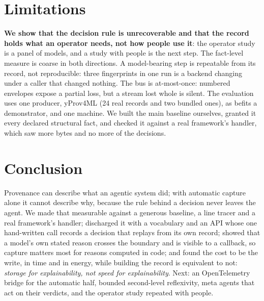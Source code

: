 \documentclass[conference]{IEEEtran}
\begin{document}
\section{Limitations}\label{sec:6}

\noindent \textbf{We show that the decision rule is unrecoverable and that the record holds what an operator needs, not how people use it}: the operator study is a panel of models, and a study with people is the next step. The fact-level measure is coarse in both directions. A model-bearing step is repeatable from its record, not reproducible: three fingerprints in one run is a backend changing under a caller that changed nothing. The bus is at-most-once: numbered envelopes expose a partial loss, but a stream lost whole is silent. The evaluation uses one producer, yProv4ML (24 real records and two bundled ones), as befits a demonstrator, and one machine. We built the main baseline ourselves, granted it every declared structural fact, and checked it against a real framework's handler, which saw more bytes and no more of the decisions.

\section{Conclusion}\label{sec:7}

\noindent Provenance can describe what an agentic system did; with automatic capture alone it cannot describe why, because the rule behind a decision never leaves the agent. We made that measurable against a generous baseline, a line tracer and a real framework's handler; discharged it with a vocabulary and an API whose one hand-written call records a decision that replays from its own record; showed that a model's own stated reason crosses the boundary and is visible to a callback, so capture matters most for reasons computed in code; and found the cost to be the write, in time and in energy, while building the record is equivalent to not: \emph{storage for explainability, not speed for explainability}. Next: an OpenTelemetry bridge for the automatic half, bounded second-level reflexivity, meta agents that act on their verdicts, and the operator study repeated with people.
\end{document}
